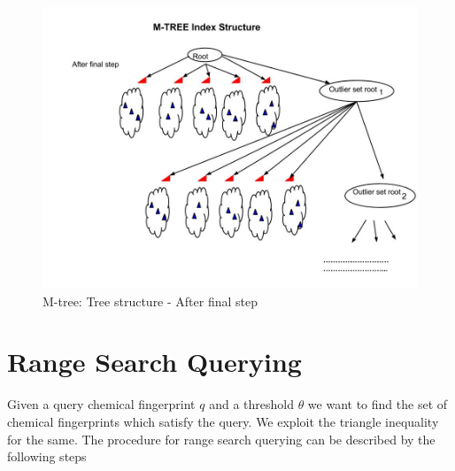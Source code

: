 \begin{figure}[ht!]	
\centering
\includegraphics[width=1 \columnwidth]{img/image0e.jpg}
\caption{M-tree: Tree structure - After final step}
\label{fig: final step}
\end{figure}




\section{Range Search Querying}

Given a query chemical fingerprint $q$ and a threshold $\theta $ we want to find the set of chemical fingerprints which satisfy the query. We exploit the triangle inequality for the same. The procedure for range search querying can be described by the following steps\\

